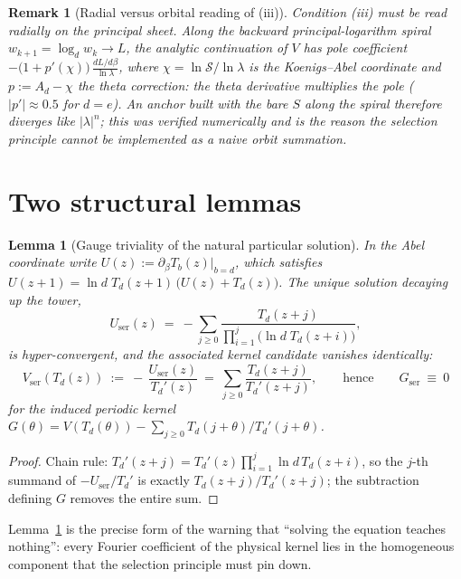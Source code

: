\documentclass[11pt]{article}
\newtheorem{lemma}[theorem]{Lemma}
\newtheorem{remark}[theorem]{Remark}
\begin{document}
\begin{remark}[Radial versus orbital reading of (iii)]\label{rem:radial}
Condition (iii) must be read radially on the principal sheet.  Along the
backward principal-logarithm spiral $w_{k+1}=\log_d w_k\to L$, the
analytic continuation of $V$ has pole coefficient
$-\bigl(1+p'(\chi)\bigr)\,\frac{dL/d\beta}{\ln\lambda}$, where
$\chi=\ln\mathcal S/\ln\lambda$ is the Koenigs--Abel coordinate and
$p:=A_d-\chi$ the theta correction: the theta derivative multiplies the
pole ($|p'|\approx0.5$ for $d=e$).  An anchor built with the bare $S$ along
the spiral therefore diverges like $|\lambda|^{n}$; this was verified
numerically and is the reason the selection principle cannot be
implemented as a naive orbit summation.
\end{remark}

\section{Two structural lemmas}

\begin{lemma}[Gauge triviality of the natural particular solution]
\label{lem:trivial}
In the Abel coordinate write $U(z):=\partial_\beta T_b(z)|_{b=d}$, which
satisfies $U(z+1)=\ln d\;T_d(z+1)\,\bigl(U(z)+T_d(z)\bigr)$.  The unique
solution decaying up the tower,
\[
  U_{\mathrm{ser}}(z)\ =\ -\sum_{j\ge0}
  \frac{T_d(z+j)}{\prod_{i=1}^{j}\bigl(\ln d\;T_d(z+i)\bigr)},
\]
is hyper-convergent, and the associated kernel candidate vanishes
identically:
\[
  V_{\mathrm{ser}}(T_d(z))\ :=\ -\,\frac{U_{\mathrm{ser}}(z)}{T_d'(z)}
  \ =\ \sum_{j\ge0}\frac{T_d(z+j)}{T_d'(z+j)},
  \qquad\text{hence}\qquad
  G_{\mathrm{ser}}\ \equiv\ 0
\]
for the induced periodic kernel $G(\theta)=V(T_d(\theta))-\sum_{j\ge0}
T_d(j{+}\theta)/T_d'(j{+}\theta)$.
\end{lemma}

\begin{proof}
Chain rule: $T_d'(z+j)=T_d'(z)\prod_{i=1}^{j}\ln d\,T_d(z+i)$, so the
$j$-th summand of $-U_{\mathrm{ser}}/T_d'$ is exactly
$T_d(z+j)/T_d'(z+j)$; the subtraction defining $G$ removes the entire sum.
\end{proof}

Lemma~\ref{lem:trivial} is the precise form of the warning that ``solving
the equation teaches nothing'': every Fourier coefficient of the physical
kernel lies in the homogeneous component that the selection principle must
pin down.
\end{document}
